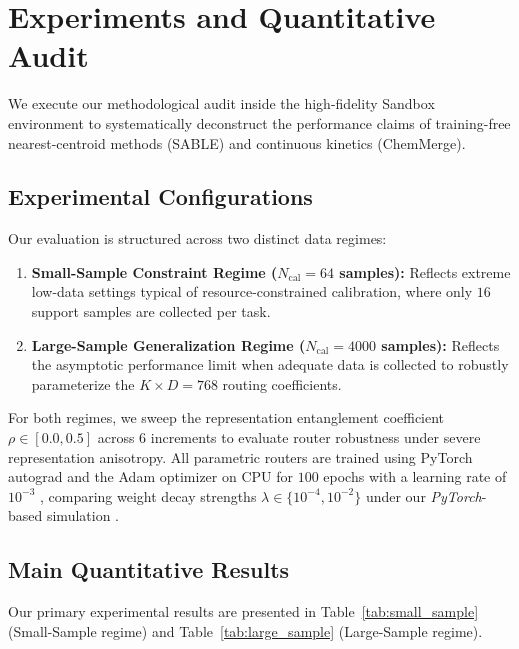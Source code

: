 \section{Experiments and Quantitative Audit}
\label{sec:experiments}

We execute our methodological audit inside the high-fidelity Sandbox environment to systematically deconstruct the performance claims of training-free nearest-centroid methods (SABLE) and continuous kinetics (ChemMerge).

\subsection{Experimental Configurations}
Our evaluation is structured across two distinct data regimes:
\begin{enumerate}
    \item \textbf{Small-Sample Constraint Regime ($N_{\text{cal}} = 64$ samples):} Reflects extreme low-data settings typical of resource-constrained calibration, where only $16$ support samples are collected per task.
    \item \textbf{Large-Sample Generalization Regime ($N_{\text{cal}} = 4000$ samples):} Reflects the asymptotic performance limit when adequate data is collected to robustly parameterize the $K \times D = 768$ routing coefficients.
\end{enumerate}

For both regimes, we sweep the representation entanglement coefficient $\rho \in [0.0, 0.5]$ across $6$ increments to evaluate router robustness under severe representation anisotropy. All parametric routers are trained using PyTorch autograd and the Adam optimizer on CPU for $100$ epochs with a learning rate of $10^{-3}$ \citep{kingma14adam}, comparing weight decay strengths $\lambda \in \{10^{-4}, 10^{-2}\}$ under our \emph{PyTorch}-based simulation \citep{paszke19pytorch}.

\subsection{Main Quantitative Results}
Our primary experimental results are presented in Table~\ref{tab:small_sample} (Small-Sample regime) and Table~\ref{tab:large_sample} (Large-Sample regime).

